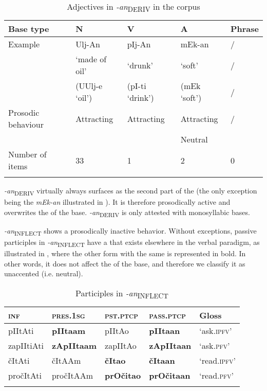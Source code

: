 \documentclass[output=paper, colorlinks, citecolor=brown, newtxmath]{langsci/langscibook}
\begin{document}
\begin{table}
\caption{Adjectives in \textit{-an}\textsubscript{DERIV} in the corpus}
\label{tab5}
\begin{tabular}{l l l l l}
\lsptoprule
 Base type & N & V & A & Phrase
\\
\midrule
Example  &  Ulj-An & pIj-An & mEk-an  & /   \\
   & `made of oil' & `drunk' & `soft' & /  \\
& (UUlj-e `oil') & (pI-ti `drink') & (mEk `soft') & /	\smallskip\\
Prosodic behaviour & Attracting & Attracting & Attracting & / \\
& & & Neutral \smallskip& \\
Number of items & 33 & 1 & 2 & 0 \\
 \lspbottomrule
 \end{tabular}
\end{table}

\textit{-an}\textsubscript{DERIV} virtually always surfaces as the second part of the  (the only exception being the  \textit{mEk-an} illustrated in ). It is therefore prosodically active and overwrites the  of the base. \textit{-an}\textsubscript{DERIV} is only attested with monosyllabic bases.

\textit{-an}\textsubscript{INFLECT} shows a prosodically inactive behavior. Without exceptions, passive participles in \textit{-an}\textsubscript{INFLECT} have a  that exists elsewhere in the verbal paradigm, as illustrated in , where the other form with the same  is represented in bold. In other words, it does not affect the  of the base, and therefore we classify it as unaccented (i.e. neutral).

\begin{table}
\caption{Participles in \textit{-an}\textsubscript{INFLECT}}
\label{tab6}
 \begin{tabular}{ l l l l l}
\lsptoprule
\textsc{inf}&\textsc{pres.1sg}&\textsc{pst.ptcp}&\textsc{pass.ptcp}& Gloss\\
\midrule
pIItAti&\textbf{pIItaam}&pIItAo&\textbf{pIItaan}&	`ask.\textsc{ipfv}' \\
zapIItiAti&\textbf{zApIItaam}&zapIItAo&\textbf{zApIItaan}&`ask.\textsc{pfv}'\\
čItAti&čItAAm&\textbf{čItao}&\textbf{čItaan}&`read.\textsc{ipfv}'\\
pročItAti&pročItAAm&\textbf{prOčitao}&\textbf{prOčitaan}&`read.\textsc{pfv}'\\
 \lspbottomrule
 \end{tabular}
\end{table}
\end{document}
